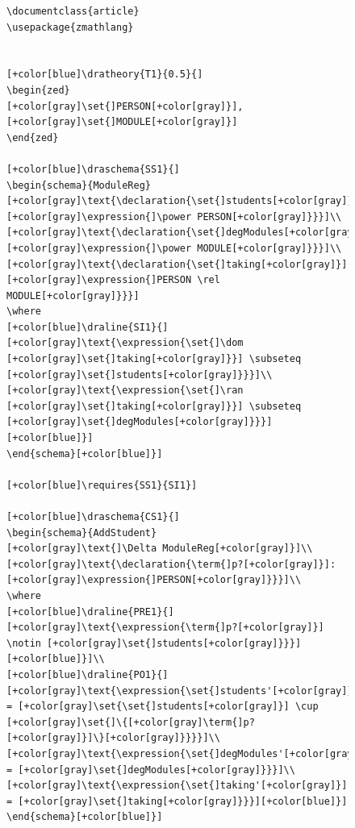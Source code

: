 \begin{figure}[H]
\vspace{-0.2in}
\centering
\begin{minipage}{0.45\textwidth}
\centering
\begin{tiny}
\begin{BVerbatim}[commandchars=+\[\]]
\documentclass{article}
\usepackage{zmathlang}


[+color[blue]\dratheory{T1}{0.5}{]
\begin{zed}
[+color[gray]\set{]PERSON[+color[gray]}], [+color[gray]\set{]MODULE[+color[gray]}]
\end{zed}

[+color[blue]\draschema{SS1}{]
\begin{schema}{ModuleReg}
[+color[gray]\text{\declaration{\set{]students[+color[gray]}]:[+color[gray]\expression{]\power PERSON[+color[gray]}}}]\\
[+color[gray]\text{\declaration{\set{]degModules[+color[gray]}]:[+color[gray]\expression{]\power MODULE[+color[gray]}}}]\\
[+color[gray]\text{\declaration{\set{]taking[+color[gray]}]:[+color[gray]\expression{]PERSON \rel MODULE[+color[gray]}}}]
\where
[+color[blue]\draline{SI1}{]
[+color[gray]\text{\expression{\set{]\dom [+color[gray]\set{]taking[+color[gray]}}] \subseteq [+color[gray]\set{]students[+color[gray]}}}]\\
[+color[gray]\text{\expression{\set{]\ran [+color[gray]\set{]taking[+color[gray]}}] \subseteq [+color[gray]\set{]degModules[+color[gray]}}}][+color[blue]}]
\end{schema}[+color[blue]}]

[+color[blue]\requires{SS1}{SI1}]

[+color[blue]\draschema{CS1}{]
\begin{schema}{AddStudent}
[+color[gray]\text{]\Delta ModuleReg[+color[gray]}]\\
[+color[gray]\text{\declaration{\term{]p?[+color[gray]}]:[+color[gray]\expression{]PERSON[+color[gray]}}}]\\
\where
[+color[blue]\draline{PRE1}{]
[+color[gray]\text{\expression{\term{]p?[+color[gray]}] \notin [+color[gray]\set{]students[+color[gray]}}}][+color[blue]}]\\
[+color[blue]\draline{PO1}{]
[+color[gray]\text{\expression{\set{]students'[+color[gray]}] = [+color[gray]\set{\set{]students[+color[gray]}] \cup
[+color[gray]\set{]\{[+color[gray]\term{]p?[+color[gray]}]\}[+color[gray]}}}}]\\
[+color[gray]\text{\expression{\set{]degModules'[+color[gray]}] = [+color[gray]\set{]degModules[+color[gray]}}}]\\
[+color[gray]\text{\expression{\set{]taking'[+color[gray]}] = [+color[gray]\set{]taking[+color[gray]}}}][+color[blue]}]
\end{schema}[+color[blue]}]


\end{BVerbatim}
\end{tiny}
\end{minipage}
\end{figure}
